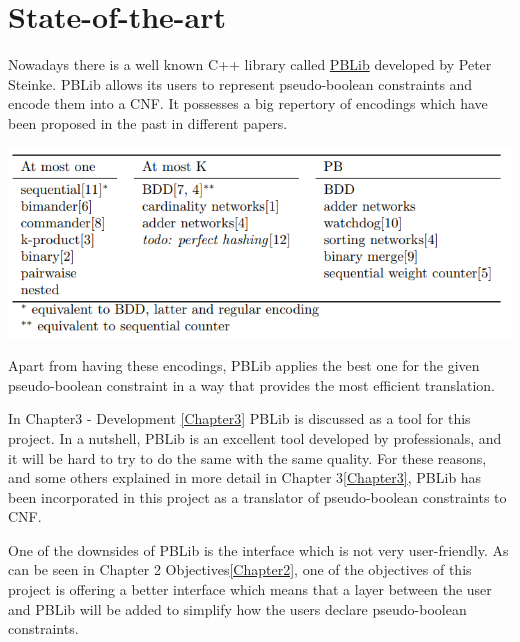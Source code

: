 \section{State-of-the-art}



Nowadays there is a well known C++ library called \href{http://tools.computational-logic.org/content/pblib.php}{PBLib} developed by Peter Steinke. PBLib allows its users to represent pseudo-boolean constraints and encode them into a CNF.  
It possesses a big repertory of encodings which have been proposed in the past in different papers\cite{Steinke2015}.  
\begin{center}
	\includegraphics[width=1\textwidth]{Figures/PBLibEncodings.png}
\end{center}
Apart from having these encodings, PBLib applies the best one for the given pseudo-boolean constraint in a way that provides the most efficient translation. 

In Chapter3 - Development \ref{Chapter3} PBLib is discussed as a tool for this project. In a nutshell, PBLib is an excellent tool developed by professionals, and it will be hard to try to do the same with the same quality. For these reasons, and some others explained in more detail in Chapter 3\ref{Chapter3}, PBLib has been incorporated in this project as a translator of pseudo-boolean constraints to CNF.  

One of the downsides of PBLib is the interface which is not very user-friendly. As can be seen in Chapter 2 Objectives\ref{Chapter2}, one of the objectives of this project is offering a better interface which means that a layer between the user and PBLib will be added to simplify how the users declare pseudo-boolean constraints.  



